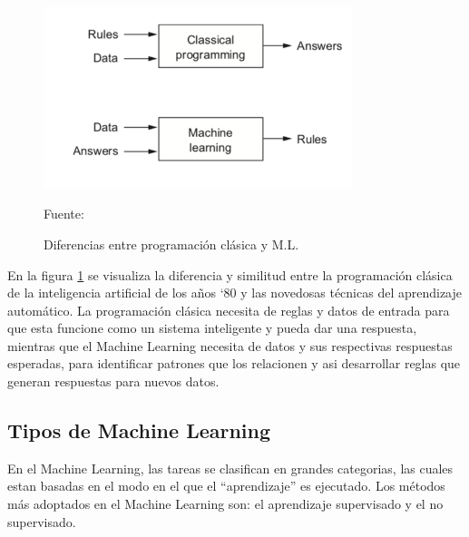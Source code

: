 \begin{figure}[H]
    \begin{center}
        \includegraphics[width=9cm]{img/capitulo_2/machinelearning.png}
    \end{center}
    \begin{center}
        \caption{Diferencias entre programación clásica y M.L.}
        Fuente: \cite{classicprog_and_ml}
        \label{fig:classical_ml}
    \end{center}
\end{figure}

En la figura \ref{fig:classical_ml} se visualiza la diferencia y similitud entre la programación clásica de la inteligencia artificial de los años `80 y las novedosas técnicas del aprendizaje automático. La programación clásica necesita de reglas y datos de entrada para que esta funcione como un sistema inteligente y pueda dar una respuesta, mientras que el Machine Learning necesita de datos y sus respectivas respuestas esperadas, para identificar patrones que los relacionen y asi desarrollar reglas que generan respuestas para nuevos datos.\\

\subsection{Tipos de Machine Learning}
En el Machine Learning, las tareas se clasifican en grandes categorias, las cuales estan basadas en el modo en el que el ``aprendizaje'' es ejecutado. Los métodos más adoptados en el Machine Learning son: el aprendizaje supervisado y el no supervisado.\\


